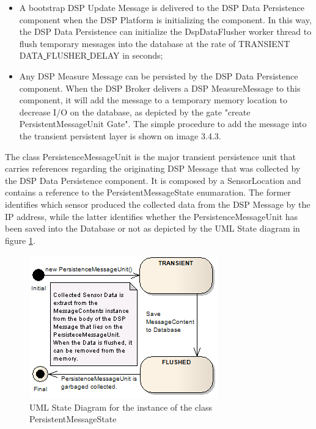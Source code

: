 \begin{itemize}
  \item A bootstrap DSP Update Message is delivered to the DSP Data Persistence
  component when the DSP Platform is initializing the component. In this way,
  the DSP Data Persistence can initialize the DspDataFlusher worker thread to
  flush temporary messages into the database at the rate of
  TRANSIENT\underline{ }DATA\underline{ }FLUSHER\underline{ }DELAY in seconds;
  \item Any DSP Measure Message can be persisted by the DSP Data Persistence
  component. When the DSP Broker delivers a DSP MeasureMessage to this
  component, it will add the message to a temporary memory location to decrease
  I/O on the database, as depicted by the gate "create PersistentMessageUnit
  Gate". The simple procedure to add the message into the transient persistent
  layer is shown on image 3.4.3.
\end{itemize}

The class PersistenceMessageUnit is the major transient persistence unit that
carries references regarding the originating DSP Message that was collected by
the DSP Data Persistence component. It is composed by a SensorLocation and
contains a reference to the PersistentMessageState enumaration. The former
identifies which sensor produced the collected data from the DSP Message by the
IP address, while the latter identifies whether the PersistenceMessageUnit has
been saved into the Database or not as depicted by the UML State diagram in
figure \ref{fig:PersistentMessageState-Diagram}.

\begin{figure}[!b]
  \centering
  \includegraphics[scale=0.5]{../diagrams/PersistentMessageState-Diagram}
  \caption{UML State Diagram for the instance of the class
  PersistentMessageState}
  \label{fig:PersistentMessageState-Diagram}
\end{figure}

